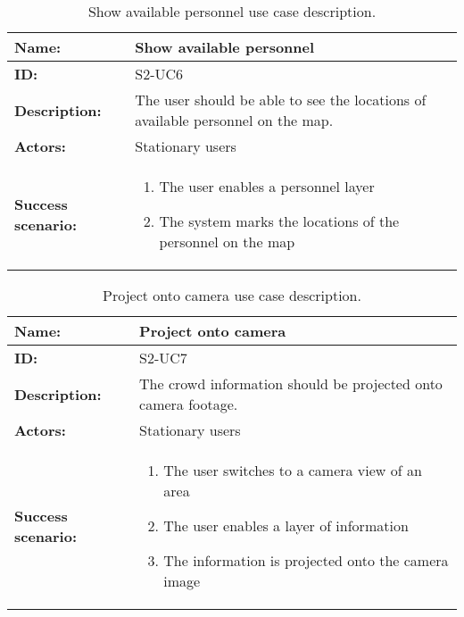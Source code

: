 \begin{table}[htbp]
    \centering
    \begin{tabularx}{\textwidth}{lX}
        \toprule
        \textbf{Name:}  & Show available personnel \\ \midrule
        \textbf{ID:}    & S2-UC6 \\ \midrule
        \textbf{Description:} & The user should be able to see the locations of available personnel on the map. \\ \midrule
        \textbf{Actors:} & Stationary users \\ \midrule
        \textbf{Success scenario:} & 
        \begin{enumerate}
            \item The user enables a personnel layer
            \item The system marks the locations of the personnel on the map
        \end{enumerate}
        \\ \bottomrule
    \end{tabularx}
    \caption{Show available personnel use case description.}
    \label{tab:s2-uc6}
\end{table}


\begin{table}[htbp]
    \centering
    \begin{tabularx}{\textwidth}{lX}
        \toprule
        \textbf{Name:}  & Project onto camera \\ \midrule
        \textbf{ID:}    & S2-UC7 \\ \midrule
        \textbf{Description:} & The crowd information should be projected onto camera footage. \\ \midrule
        \textbf{Actors:} & Stationary users \\ \midrule
        \textbf{Success scenario:} & 
        \begin{enumerate}
            \item The user switches to a camera view of an area
            \item The user enables a layer of information
            \item The information is projected onto the camera image
        \end{enumerate}
        \\ \bottomrule
    \end{tabularx}
    \caption{Project onto camera use case description.}
    \label{tab:s2-uc7}
\end{table}
